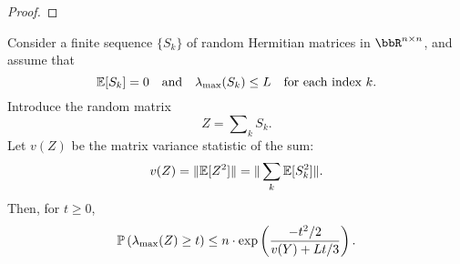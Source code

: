 \begin{proof}



\end{proof}


\begin{theorem} \label{thm:intdim-bernstein-herm}
	Consider a finite sequence $\{ S_k \}$ of random Hermitian matrices in $\RR^{n\times n}$, and assume that
	\begin{equation*}
	\E [S_k] = 0
	\quad\text{and}\quad
	\lambda_{\max}(S_k) \leq L
	\quad\text{for each index $k$.}
	\end{equation*}
	Introduce the random matrix
	\begin{equation*}
	Z = \sum\nolimits_k S_k.
	\end{equation*}
	Let $v(Z)$ be the matrix variance statistic of the sum:
	\begin{equation*}
	v(Z) = \|\E [Z^2]\| = \|\sum_k \E [S_k^2]\|.
	\end{equation*}
	Then, for $t \geq 0$,
	\begin{equation} \label{eqn:intdim-bernstein-tail}
	\Prob \left( \lambda_{\max}(Z) \geq t \right)
	\leq n \cdot \exp\left( \frac{-t^2/2}{v(Y) + Lt/3} \right).
	\end{equation}
	\label{thm:bernstein}
\end{theorem}
	

